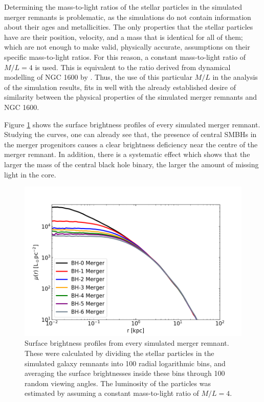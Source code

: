 \documentclass[english, oneside]{HYgradu}
\begin{document}
Determining the mass-to-light ratios of the stellar particles in the simulated merger remnants is problematic, as the simulations do not contain information about their ages and metallicities. The only properties that the stellar particles have are their position, velocity, and a mass that is identical for all of them; which are not enough to make valid, physically accurate, assumptions on their specific mass-to-light ratios. For this reason, a constant mass-to-light ratio of $M/L = 4$ is used. This is equivalent to the ratio derived from dynamical modelling of NGC 1600 by \cite{Thomas2016}. Thus, the use of this particular $M/L$ in the analysis of the simulation results, fits in well with the already established desire of similarity between the physical properties of the simulated merger remnants and NGC 1600.

Figure \ref{figure:surface_brightness} shows the surface brightness profiles of every simulated merger remnant. Studying the curves, one can already see that, the presence of central SMBHs in the merger progenitors causes a clear brightness deficiency near the centre of the merger remnant. In addition, there is a systematic effect which shows that the larger the mass of the central black hole binary, the larger the amount of missing light in the core.

\begin{figure}[h]
	\centering
	\includegraphics[width=\textwidth]{SurfaceBrightnessProfiles.png}
	\caption{Surface brightness profiles from every simulated merger remnant. These were calculated by dividing the stellar particles in the simulated galaxy remnants into 100 radial logarithmic bins, and averaging the surface brightnesses inside these bins through 100 random viewing angles. The luminosity of the particles was estimated by assuming a constant mass-to-light ratio of $M/L = 4$.}
	\label{figure:surface_brightness}
\end{figure}
\end{document}
